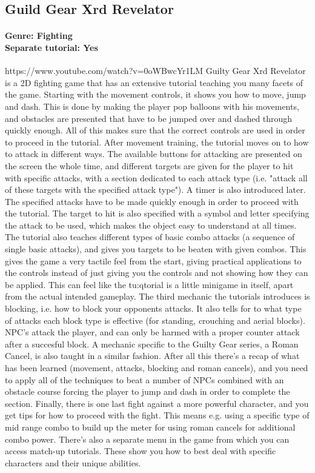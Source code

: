 \subsection{Guild Gear Xrd Revelator}
\paragraph{Genre: Fighting \\ Separate tutorial: Yes \\}
https://www.youtube.com/watch?v=0oWBwcYr1LM
Guilty Gear Xrd Revelator is a 2D fighting game that has an extensive tutorial
teaching you many facets of the game. Starting with the movement controls, it
shows you how to move, jump and dash. This is done by making the player pop
balloons with his movements, and obstacles are presented that have to be
jumped over and dashed through quickly enough. All of this makes sure that the correct controls are used in
order to proceed in the tutorial.
After movement training, the tutorial moves on to how to attack in different
ways. The available buttons for attacking are presented on the screen the
whole time, and different targets are given for the player to hit with
specific attacks, with a section dedicated to each attack type (i.e. "attack
all of these targets with the specified attack type"). A timer is also
introduced later. The specified attacks have to be made quickly enough in
order to proceed with the tutorial. The target to hit is also specified with a
symbol and letter specifying the attack to be used, which makes the object
easy to understand at all times. The tutorial also teaches different types of
basic combo attacks (a sequence of single basic attacks), and gives you targets to be beaten with given combos.
This gives the game a very tactile feel from the start, giving practical
applications to the controls instead of just giving you the controls and not
showing how they can be applied. This can feel like the tu:qtorial is a little
minigame in itself, apart from the actual intended gameplay.
The third mechanic the tutorials introduces is blocking, i.e. how to block
your opponents attacks. It also tells for to what type of attacks each block
type is effective (for standing, crouching and aerial blocks). NPC's attack
the player, and can only be harmed with a proper counter attack after a
succesful block. A mechanic specific to the Guilty Gear series, a Roman
Cancel, is also taught in a similar fashion.
After all this there's a recap of what has been learned (movement, attacks,
blocking and roman cancels), and you need to apply all of the techniques to
beat a number of NPCs combined with an obstacle course forcing the player to
jump and dash in order to complete the section. Finally, there is one last
fight against a more powerful character, and you get tips for how to proceed
with the fight. This means e.g. using a specific type of mid range combo to
build up the meter for using roman cancels for additional combo power.
There's also a separate menu in the game from which you can access match-up
tutorials. These show you how to best deal with specific characters and their
unique abilities.


